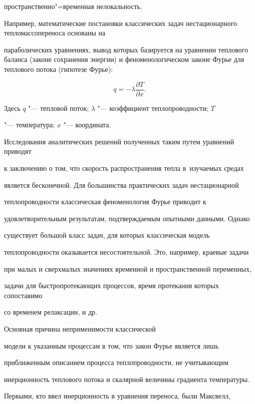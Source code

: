 пространственно"=временная нелокальность. 

Например, математические постановки классических задач нестационарного тепломассопереноса основаны на

параболических уравнениях, вывод которых базируется на уравнении теплового баланса (законе сохранения энергии) и феноменологическом законе Фурье для теплового потока (гипотезе Фурье):

\begin{equation}

\label{kud:eq1}

q=-\lambda \frac{ \partial T}{\partial x}.

\end{equation}

Здесь $q$ "--- тепловой поток; $\lambda$ "--- коэффициент теплопроводности; $T$

"--- температура; $x$ "--- координата.



Исследования аналитических решений полученных таким путем уравнений приводят

к заключению о том, что скорость распространения тепла в~изучаемых средах

является бесконечной. Для большинства практических задач нестационарной

теплопроводности классическая феноменология Фурье приводит к

удовлетворительным результатам, подтверждаемым опытными данными. Однако

существует большой класс задач, для которых классическая модель

теплопроводности оказывается несостоятельной. Это, например, краевые задачи

при малых и сверхмалых значениях временной и пространственной переменных,

задачи для быстропротекающих процессов, время протекания которых сопоставимо

со временем релаксации, и др. 

Основная причина неприменимости классической

модели к указанным процессам в том, что закон Фурье является лишь

приближенным описанием процесса теплопроводности, не учитывающим

инерционность теплового потока и скалярной величины градиента температуры.

Первыми, кто ввел инерционность в уравнения переноса, были Максвелл,

